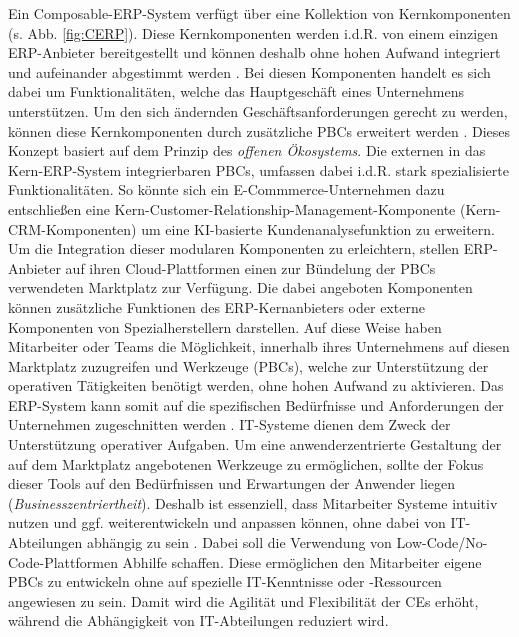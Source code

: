 Ein Composable-ERP-System verfügt über eine Kollektion von Kernkomponenten (s. Abb. \ref{fig:CERP})\cite[7]{Sensedia.2020}. Diese Kernkomponenten werden i.d.R. von einem einzigen ERP-Anbieter bereitgestellt und können deshalb ohne hohen Aufwand integriert und aufeinander abgestimmt werden \cite[S. 29 ff.]{Sarferaz.2022}. Bei diesen Komponenten handelt es sich dabei um Funktionalitäten, welche das Hauptgeschäft eines Unternehmens unterstützen. Um den sich ändernden Geschäftsanforderungen gerecht zu werden, können diese Kernkomponenten durch zusätzliche PBCs erweitert werden \cite[58]{.2009}. Dieses Konzept basiert auf dem Prinzip des \textit{offenen Ökosystems}. Die externen in das Kern-ERP-System integrierbaren PBCs, umfassen dabei i.d.R. stark spezialisierte Funktionalitäten. So könnte sich ein E-Commmerce-Unternehmen dazu entschließen eine Kern-Customer-Relationship-Management-Komponente (Kern-\acs{CRM}-Komponenten) um eine KI-basierte Kundenanalysefunktion zu erweitern. Um die Integration dieser modularen Komponenten zu erleichtern, stellen ERP-Anbieter auf ihren Cloud-Plattformen einen zur Bündelung der PBCs verwendeten Marktplatz zur Verfügung. Die dabei angeboten Komponenten können zusätzliche Funktionen des ERP-Kernanbieters oder externe Komponenten von Spezialherstellern darstellen. Auf diese Weise haben Mitarbeiter oder Teams die Möglichkeit, innerhalb ihres Unternehmens auf diesen Marktplatz zuzugreifen und Werkzeuge (PBCs), welche zur Unterstützung der operativen Tätigkeiten benötigt werden, ohne hohen Aufwand zu aktivieren. Das ERP-System kann somit auf die spezifischen Bedürfnisse und Anforderungen der Unternehmen zugeschnitten werden \cite[S. 29 ff.]{Sarferaz.2022}. IT-Systeme dienen dem Zweck der Unterstützung operativer Aufgaben. Um eine anwenderzentrierte Gestaltung der auf dem Marktplatz angebotenen Werkzeuge zu ermöglichen, sollte der Fokus dieser Tools auf den Bedürfnissen und Erwartungen der Anwender liegen (\textit{Businesszentriertheit}). Deshalb ist essenziell, dass Mitarbeiter Systeme intuitiv nutzen und ggf. weiterentwickeln und anpassen können, ohne dabei von IT-Abteilungen abhängig zu sein \cite{.20230313}. Dabei soll die Verwendung von Low-Code/No-Code-Plattformen Abhilfe schaffen. Diese ermöglichen den Mitarbeiter eigene PBCs zu entwickeln ohne auf spezielle IT-Kenntnisse oder -Ressourcen angewiesen zu sein. Damit wird die Agilität und Flexibilität der CEs erhöht, während die Abhängigkeit von IT-Abteilungen reduziert wird.


